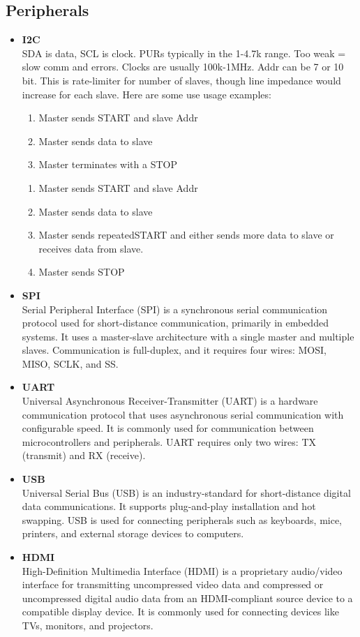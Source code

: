 \documentclass{article}
\begin{document}
    \subsection{Peripherals}
      \begin{itemize}
        \item \textbf{I2C}\\
          SDA is data, SCL is clock. PURs typically in the 1-4.7k range. Too weak = slow comm and errors. Clocks are usually 100k-1MHz. Addr can be 7 or 10 bit. This is rate-limiter for number of slaves, though line impedance would increase for each slave. Here are some use usage examples:
          \begin{enumerate}
            \item Master sends START and slave Addr
            \item Master sends data to slave
            \item Master terminates with a STOP
          \end{enumerate}
          \begin{enumerate}
            \item Master sends START and slave Addr
            \item Master sends data to slave
            \item Master sends repeatedSTART and either sends more data to slave or receives data from slave.
            \item Master sends STOP
          \end{enumerate}
        \item \textbf{SPI}\\
          Serial Peripheral Interface (SPI) is a synchronous serial communication protocol used for short-distance communication, primarily in embedded systems. It uses a master-slave architecture with a single master and multiple slaves. Communication is full-duplex, and it requires four wires: MOSI, MISO, SCLK, and SS.
        \item \textbf{UART}\\
          Universal Asynchronous Receiver-Transmitter (UART) is a hardware communication protocol that uses asynchronous serial communication with configurable speed. It is commonly used for communication between microcontrollers and peripherals. UART requires only two wires: TX (transmit) and RX (receive).
        \item \textbf{USB}\\
          Universal Serial Bus (USB) is an industry-standard for short-distance digital data communications. It supports plug-and-play installation and hot swapping. USB is used for connecting peripherals such as keyboards, mice, printers, and external storage devices to computers.
        \item \textbf{HDMI}\\
          High-Definition Multimedia Interface (HDMI) is a proprietary audio/video interface for transmitting uncompressed video data and compressed or uncompressed digital audio data from an HDMI-compliant source device to a compatible display device. It is commonly used for connecting devices like TVs, monitors, and projectors.
      \end{itemize}
\end{document}
